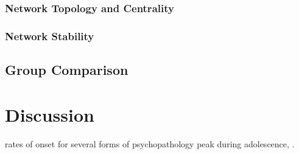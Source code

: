 \documentclass[preprint, 3p,
authoryear]{elsarticle} %
\begin{document}
\hypertarget{network-topology-and-centrality}{%
\subsubsection{Network Topology and
Centrality}\label{network-topology-and-centrality}}

\hypertarget{network-stability}{%
\subsubsection{Network Stability}\label{network-stability}}

\hypertarget{group-comparison}{%
\subsection{Group Comparison}\label{group-comparison}}

\hypertarget{discussion}{%
\section{Discussion}\label{discussion}}

rates of onset for several forms of psychopathology peak during
adolescence, \citep{guyer_adolescent_2020}.

\renewcommand\refname{References}

\end{document}
